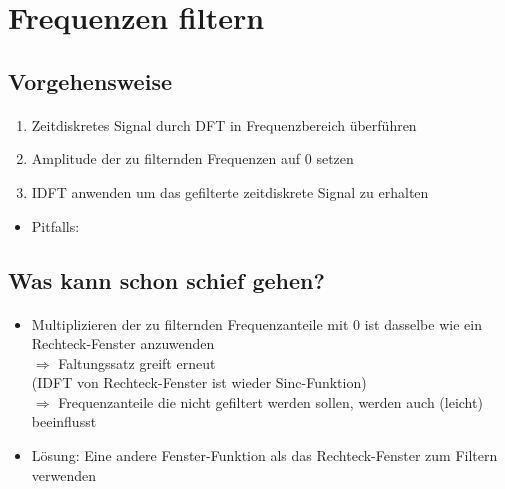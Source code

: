 \section{Frequenzen filtern}
\subsection{Vorgehensweise}
\begin{frame}{\insertsection}
	\framesubtitle{\insertsubsection}
	\begin{enumerate}
		\item Zeitdiskretes Signal durch DFT in Frequenzbereich überführen
		\item Amplitude der zu filternden Frequenzen auf $0$ setzen
		\item IDFT anwenden um das gefilterte zeitdiskrete Signal zu erhalten
	\end{enumerate}
	\begin{itemize}
		\item Pitfalls: 
	\end{itemize}
\end{frame}

\subsection{Was kann schon schief gehen?}
\begin{frame}{\insertsection}
	\framesubtitle{\insertsubsection}
	\begin{itemize}
		\item Multiplizieren der zu filternden Frequenzanteile mit $0$ ist dasselbe wie ein Rechteck-Fenster anzuwenden
		\\ $\Rightarrow$ Faltungssatz greift erneut\\(IDFT von Rechteck-Fenster ist wieder Sinc-Funktion)
		\\ $\Rightarrow$ Frequenzanteile die nicht gefiltert werden sollen, werden auch (leicht) beeinflusst
		\item Lösung: Eine andere Fenster-Funktion als das Rechteck-Fenster zum Filtern verwenden
	\end{itemize}
\end{frame}